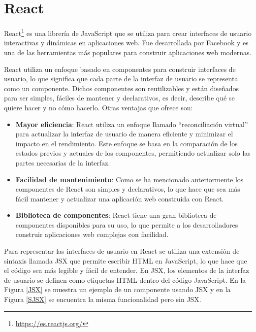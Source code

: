 \section{React}\label{sec:React}
React\footnote{\url{https://es.reactjs.org/}} es una librería de JavaScript que se utiliza para crear interfaces de usuario interactivas y dinámicas en aplicaciones web. Fue desarrollada por Facebook y es una de las herramientas más populares para construir aplicaciones web modernas.

React utiliza un enfoque basado en componentes para construir interfaces de usuario, lo que significa que cada parte de la interfaz de usuario se representa como un componente. Dichos componentes son reutilizables y están diseñados para ser simples, fáciles de mantener y declarativos, es decir, describe qué se quiere hacer y no cómo hacerlo. Otras ventajas que ofrece son:

\begin{itemize}
  \item \textbf{Mayor eficiencia}: React utiliza un enfoque llamado ``reconciliación virtual'' para actualizar la interfaz de usuario de manera eficiente y minimizar el impacto en el rendimiento. Este enfoque se basa en la comparación de los estados previos y actuales de los componentes, permitiendo actualizar solo las partes necesarias de la interfaz.
  \item \textbf{Facilidad de mantenimiento}: Como se ha mencionado anteriormente los componentes de React son simples y declarativos, lo que hace que sea más fácil mantener y actualizar una aplicación web construida con React.
  \item \textbf{Biblioteca de componentes}: React tiene una gran biblioteca de componentes disponibles para su uso, lo que permite a los desarrolladores construir aplicaciones web complejas con facilidad.
\end{itemize}

Para representar las interfaces de usuario en React se utiliza una extensión de sintaxis llamada JSX que permite escribir HTML en JavaScript, lo que hace que el código sea más legible y fácil de entender. En JSX, los elementos de la interfaz de usuario se definen como etiquetas HTML dentro del código JavaScript. En la Figura \ref{JSX} se muestra un ejemplo de un componente usando JSX y en la Figura \ref{SJSX} se encuentra la misma funcionalidad pero sin JSX.

